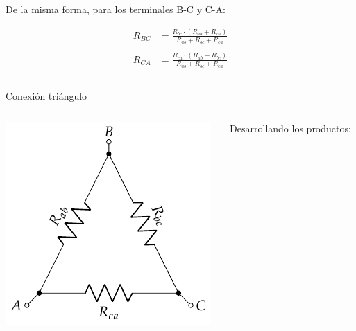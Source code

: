 \documentclass[aspectratio=169, xcolor={usenames,svgnames,dvipsnames}]{beamer}
\begin{document}
\begin{frame}
\begin{columns}
\begin{column}{0.5\columnwidth}
    \vspace{3mm}
    De la misma forma, para los terminales B-C y C-A:

    \vspace{-6mm}
    \begin{align*}
      R_{BC} &= \frac{R_{bc} \cdot (R_{ab} + R_{ca})}{R_{ab} + R_{bc} + R_{ca}}\\
      \\
      R_{CA} &= \frac{R_{ca} \cdot (R_{ab} + R_{bc})}{R_{ab} + R_{bc} + R_{ca}}
    \end{align*}
    \end{column}
    \end{columns}
\end{frame}


\begin{frame}{Conexión triángulo}
    \begin{columns}
    \begin{column}{0.4\columnwidth}
    \begin{center}
    \includegraphics[width=1.1\linewidth]{../figs/Conexion_Triangulo.pdf}
    \end{center}
    \end{column}
    \begin{column}{0.5\columnwidth}
    Desarrollando los productos:

\end{column}
\end{columns}
\end{frame}
\end{document}
